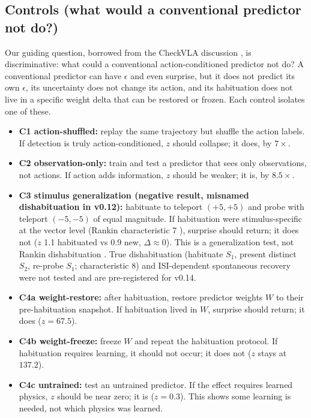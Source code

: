 \documentclass[11pt,a4paper]{article}
\begin{document}
\subsection{Controls (what would a conventional predictor not do?)}

Our guiding question, borrowed from the CheckVLA discussion \cite{checkvla2026}, is discriminative: what could a conventional action-conditioned predictor not do? A conventional predictor can have $\epsilon$ and even surprise, but it does not predict its own $\epsilon$, its uncertainty does not change its action, and its habituation does not live in a specific weight delta that can be restored or frozen. Each control isolates one of these.

\begin{itemize}[leftmargin=1.2em]
    \item \textbf{C1 action-shuffled:} replay the same trajectory but shuffle the action labels. If detection is truly action-conditioned, $z$ should collapse; it does, by $7\times$.
    \item \textbf{C2 observation-only:} train and test a predictor that sees only observations, not actions. If action adds information, $z$ should be weaker; it is, by $8.5\times$.
    \item \textbf{C3 stimulus generalization (negative result, misnamed dishabituation in v0.12):} habituate to teleport $(+5,+5)$ and probe with teleport $(-5,-5)$ of equal magnitude. If habituation were stimulus-specific at the vector level (Rankin characteristic 7 \cite{rankin2009}), surprise should return; it does not ($z$ 1.1 habituated vs 0.9 new, $\Delta\approx0$). This is a generalization test, not Rankin dishabituation \cite{rankin2009}. True dishabituation (habituate $S_1$, present distinct $S_2$, re-probe $S_1$; characteristic 8) and ISI-dependent spontaneous recovery \cite{thompson1966} were not tested and are pre-registered for v0.14.
    \item \textbf{C4a weight-restore:} after habituation, restore predictor weights $W$ to their pre-habituation snapshot. If habituation lived in $W$, surprise should return; it does ($z=67.5$).
    \item \textbf{C4b weight-freeze:} freeze $W$ and repeat the habituation protocol. If habituation requires learning, it should not occur; it does not ($z$ stays at $137.2$).
    \item \textbf{C4c untrained:} test an untrained predictor. If the effect requires learned physics, $z$ should be near zero; it is ($z=0.3$). This shows some learning is needed, not which physics was learned.
\end{itemize}
\end{document}
